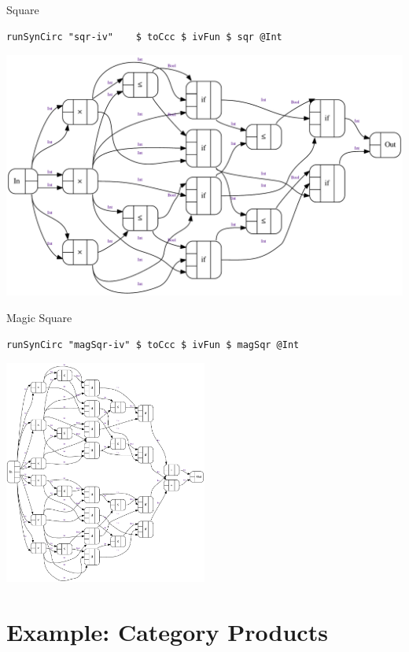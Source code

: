 \documentclass[10pt]{beamer}
\theoremstyle{definition}
\theoremstyle{remark}
\numberwithin{equation}{section}
\begin{document}
\begin{frame}[fragile]{Square}
  \begin{lstlisting}[frame=single]
    runSynCirc "sqr-iv"    $ toCcc $ ivFun $ sqr @Int
  \end{lstlisting}
  \begin{center}
    \includegraphics[width=1.0\textwidth]{sqr-iv.pdf}
  \end{center}
\end{frame}

\begin{frame}[fragile]{Magic Square}
  \begin{lstlisting}[frame=single]
    runSynCirc "magSqr-iv" $ toCcc $ ivFun $ magSqr @Int
  \end{lstlisting}
  \begin{center}
    \includegraphics[width=0.5\textwidth]{magSqr-iv.pdf}
  \end{center}
\end{frame}

\section{Example: Category Products} %
\end{document}

